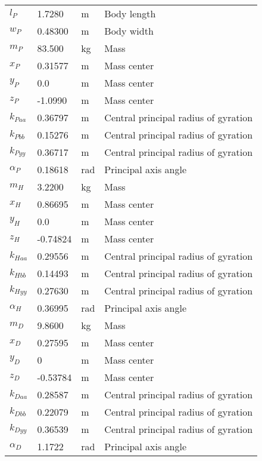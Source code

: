\documentclass{bmd2019a}
\begin{document}
\begin{table}
\begin{tabular}{llll}
    \midrule
    $l_P$ &  1.7280 & \si{\meter} & Body length \\
    $w_P$ &  0.48300 & \si{\meter} & Body width \\
    $m_P$ &  83.500 & \si{\kilogram} & Mass \\
    $x_P$ &  0.31577 & \si{\meter} & Mass center \\
    $y_P$ & 0.0 & \si{\meter} & Mass center \\
    $z_P$ & -1.0990 & \si{\meter} & Mass center \\
    $k_{Paa}$ &  0.36797 & \si{\meter} & Central principal radius of gyration \\
    $k_{Pbb}$ &  0.15276 & \si{\meter} & Central principal radius of gyration \\
    $k_{Pyy}$ &  0.36717 & \si{\meter} & Central principal radius of gyration \\
    $\alpha_P$ & 0.18618 & \si{\radian} & Principal axis angle \\
    \midrule
    $m_H$ & 3.2200 & \si{\kilogram} & Mass \\
    $x_H$ & 0.86695 & \si{\meter} & Mass center \\
    $y_H$ & 0.0 & \si{\meter} & Mass center \\
    $z_H$ & -0.74824 & \si{\meter} & Mass center \\
    $k_{Haa}$ & 0.29556 & \si{\meter} & Central principal radius of gyration \\
    $k_{Hbb}$ & 0.14493 & \si{\meter} & Central principal radius of gyration \\
    $k_{Hyy}$ & 0.27630 & \si{\meter} & Central principal radius of gyration \\
    $\alpha_H$ & 0.36995 & \si{\radian} & Principal axis angle \\
    \midrule
    $m_D$ &  9.8600 & \si{\kilogram} & Mass \\
    $x_D$ &  0.27595 & \si{\meter} & Mass center \\
    $y_D$ & 0 & \si{\meter} & Mass center \\
    $z_D$ & -0.53784 & \si{\meter} & Mass center \\
    $k_{Daa}$ &  0.28587 & \si{\meter} & Central principal radius of gyration \\
    $k_{Dbb}$ &  0.22079 & \si{\meter} & Central principal radius of gyration \\
    $k_{Dyy}$ &  0.36539 & \si{\meter} & Central principal radius of gyration \\
    $\alpha_D$ &  1.1722 & \si{\radian} & Principal axis angle \\
    \bottomrule
  \end{tabular}
\end{table}
\end{document}
